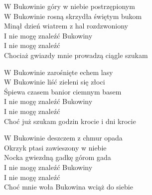 
\begin{text}
    \chordfill
    W Bukowinie góry w niebie postrzępionym\\
    W Bukowinie rosną skrzydła świętym bukom\\
    Minął dzień wiatrem z hal rozdzwoniony\\
    I nie mogę znaleźć Bukowiny\\
    I nie mogę znaleźć\\
    Chociaż gwiazdy mnie prowadzą ciągle szukam

    W Bukowinie zarośnięte echem lasy\\
    W Bukowinie liść zieleni się złoci\\
    Śpiewa czasem banior ciemnym basem\\
    I nie mogę znaleźć Bukowiny\\
    I nie mogę znaleźć\\
    Choć już szukam godzin krocie i dni krocie

    W Bukowinie deszczem z chmur opada\\
    Okrzyk ptasi zawieszony w niebie\\
    Nocka gwiezdną gadkę górom gada\\
    I nie mogę znaleźć Bukowiny\\
    I nie mogę znaleźć\\
    Choć mnie woła Bukowina wciąż do siebie
\end{text}
